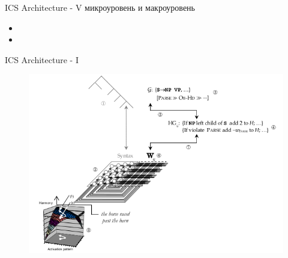 \documentclass{beamer}
\begin{document}
\begin{frame}{ICS Architecture - V}
микроуровень и макроуровень
\bigskip
\begin{itemize}
	\item 
	\medskip
	\item 
\end{itemize}
\end{frame}

\fi

\begin{frame}{ICS Architecture - I}
\begin{center}
	\begin{figure}[H]
		\includegraphics[scale=0.4]{ics1.png} 
	\end{figure}
\end{center}
\end{frame}
\end{document}
